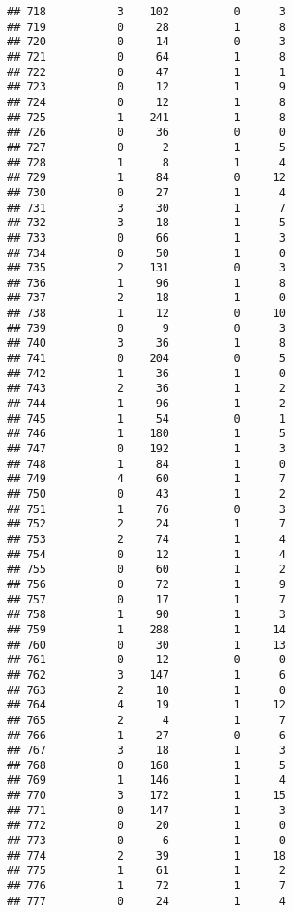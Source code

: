 \documentclass[]{article}
\begin{document}
\begin{verbatim}
## 718           3    102          0      3
## 719           0     28          1      8
## 720           0     14          0      3
## 721           0     64          1      8
## 722           0     47          1      1
## 723           0     12          1      9
## 724           0     12          1      8
## 725           1    241          1      8
## 726           0     36          0      0
## 727           0      2          1      5
## 728           1      8          1      4
## 729           1     84          0     12
## 730           0     27          1      4
## 731           3     30          1      7
## 732           3     18          1      5
## 733           0     66          1      3
## 734           0     50          1      0
## 735           2    131          0      3
## 736           1     96          1      8
## 737           2     18          1      0
## 738           1     12          0     10
## 739           0      9          0      3
## 740           3     36          1      8
## 741           0    204          0      5
## 742           1     36          1      0
## 743           2     36          1      2
## 744           1     96          1      2
## 745           1     54          0      1
## 746           1    180          1      5
## 747           0    192          1      3
## 748           1     84          1      0
## 749           4     60          1      7
## 750           0     43          1      2
## 751           1     76          0      3
## 752           2     24          1      7
## 753           2     74          1      4
## 754           0     12          1      4
## 755           0     60          1      2
## 756           0     72          1      9
## 757           0     17          1      7
## 758           1     90          1      3
## 759           1    288          1     14
## 760           0     30          1     13
## 761           0     12          0      0
## 762           3    147          1      6
## 763           2     10          1      0
## 764           4     19          1     12
## 765           2      4          1      7
## 766           1     27          0      6
## 767           3     18          1      3
## 768           0    168          1      5
## 769           1    146          1      4
## 770           3    172          1     15
## 771           0    147          1      3
## 772           0     20          1      0
## 773           0      6          1      0
## 774           2     39          1     18
## 775           1     61          1      2
## 776           1     72          1      7
## 777           0     24          1      4

\end{verbatim}
\end{document}
